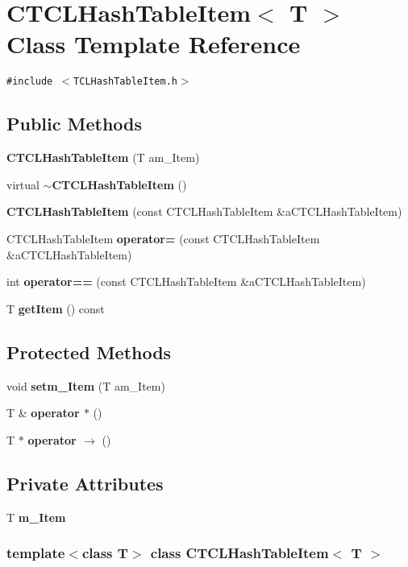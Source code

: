 \section{CTCLHash\-Table\-Item$<$ T $>$  Class Template Reference}
\label{classCTCLHashTableItem}
{\tt \#include $<$TCLHash\-Table\-Item.h$>$}

\subsection*{Public Methods}
\begin{CompactItemize}
\item 
{\bf CTCLHash\-Table\-Item} (T am\_\-Item)
\item 
virtual {\bf $\sim$CTCLHash\-Table\-Item} ()
\item 
{\bf CTCLHash\-Table\-Item} (const CTCLHash\-Table\-Item \&a\-CTCLHash\-Table\-Item)
\item 
CTCLHash\-Table\-Item {\bf operator=} (const CTCLHash\-Table\-Item \&a\-CTCLHash\-Table\-Item)
\item 
int {\bf operator==} (const CTCLHash\-Table\-Item \&a\-CTCLHash\-Table\-Item)
\item 
T {\bf get\-Item} () const
\end{CompactItemize}
\subsection*{Protected Methods}
\begin{CompactItemize}
\item 
void {\bf setm\_\-Item} (T am\_\-Item)
\item 
T \& {\bf operator $\ast$} ()
\item 
T $\ast$ {\bf operator $\rightarrow$ } ()
\end{CompactItemize}
\subsection*{Private Attributes}
\begin{CompactItemize}
\item 
T {\bf m\_\-Item}
\end{CompactItemize}
\subsubsection*{template$<$class T$>$ class CTCLHash\-Table\-Item$<$ T $>$}



